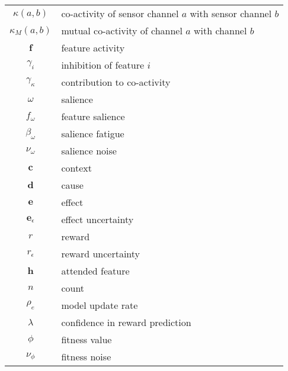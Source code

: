 \begin{table}[htdp]
\begin{center}
\begin{tabular}{|c|l|}
$\kappa(a, b)$ & co-activity of sensor channel $a$ with sensor channel $b$\\
$\kappa_M(a,b)$ & mutual co-activity of channel $a$ with channel $b$ \\
$\mathbf{f}$ & feature activity \\
$\gamma_i$ & inhibition of feature $i$ \\
$\gamma_\kappa$ & contribution to co-activity \\
$\omega$ & salience \\
$f_\omega$ & feature salience \\
$\beta_\omega$ & salience fatigue \\
$\nu_\omega$ & salience noise \\
$\mathbf{c}$ & context \\
$\mathbf{d}$ & cause \\
$\mathbf{e}$ & effect \\
$\mathbf{e}_\epsilon$ & effect uncertainty\\
$r$ & reward \\
$r_\epsilon$ & reward uncertainty \\
$\mathbf{h}$ & attended feature \\
$n$ & count \\
$\rho_e$ & model update rate \\
$\lambda$ & confidence in reward prediction \\
$\phi$ & fitness value \\
$\nu_\phi$ & fitness noise \\
\hline
\end{tabular}
\end{center}
\label{table:notation}
\end{table}%
